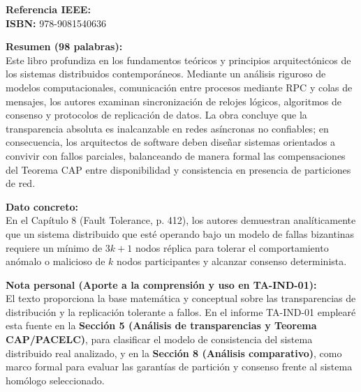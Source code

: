 \documentclass[11pt,a4paper]{article}
\begin{document}
\vspace{0.4cm}

\begin{tcolorbox}[colback=white,colframe=black!75!black,title=\textbf{Ficha Bibliográfica 5: Libro Canónico Académico}]
\textbf{Referencia IEEE:} \cite{ref5_distributed_systems_4} \\
\textbf{ISBN:} 978-9081540636

\vspace{0.2cm}
\textbf{Resumen (98 palabras):} \\
Este libro profundiza en los fundamentos teóricos y principios arquitectónicos de los sistemas distribuidos contemporáneos. Mediante un análisis riguroso de modelos computacionales, comunicación entre procesos mediante RPC y colas de mensajes, los autores examinan sincronización de relojes lógicos, algoritmos de consenso y protocolos de replicación de datos. La obra concluye que la transparencia absoluta es inalcanzable en redes asíncronas no confiables; en consecuencia, los arquitectos de software deben diseñar sistemas orientados a convivir con fallos parciales, balanceando de manera formal las compensaciones del Teorema CAP entre disponibilidad y consistencia en presencia de particiones de red.

\vspace{0.2cm}
\textbf{Dato concreto:} \\
En el Capítulo 8 (Fault Tolerance, p. 412), los autores demuestran analíticamente que un sistema distribuido que esté operando bajo un modelo de fallas bizantinas requiere un mínimo de $3k + 1$ nodos réplica para tolerar el comportamiento anómalo o malicioso de $k$ nodos participantes y alcanzar consenso determinista.

\vspace{0.2cm}
\textbf{Nota personal (Aporte a la comprensión y uso en TA-IND-01):} \\
El texto proporciona la base matemática y conceptual sobre las transparencias de distribución y la replicación tolerante a fallos. En el informe TA-IND-01 emplearé esta fuente en la \textbf{Sección 5 (Análisis de transparencias y Teorema CAP/PACELC)}, para clasificar el modelo de consistencia del sistema distribuido real analizado, y en la \textbf{Sección 8 (Análisis comparativo)}, como marco formal para evaluar las garantías de partición y consenso frente al sistema homólogo seleccionado.
\end{tcolorbox}

\vspace{0.5cm}
\printbibliography[title={Referencias Bibliográficas (Formato IEEE)}]
\end{document}
